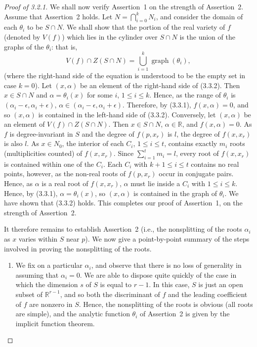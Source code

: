 \documentclass[11pt]{article}
\theoremstyle{plain}
\theoremstyle{definition}
\newcommand{\R}{\mathbb{R}}
\begin{document}
\begin{proof}[Proof of 3.2.1]
We shall now verify Assertion~1 on the strength of Assertion~2. Assume
that Assertion~2 holds. Let $N = \bigcap_{i=0}^{k} N_i$, and consider
the domain of each $\theta_i$ to be $S \cap N$. We shall show that the
portion of the real variety of $f$ (denoted by $V(f)$) which lies in
the cylinder over $S \cap N$ is the union of the graphs of the
$\theta_i$: that is,
\begin{equation}
V(f) \cap Z(S \cap N) = \bigcup_{i=1}^{k} \operatorname{graph}(\theta_i), \tag{3.3.2}
\end{equation}
(where the right-hand side of the equation is understood to be the
empty set in case $k = 0$). Let $(x, \alpha)$ be an element of the
right-hand side of (3.3.2). Then $x \in S \cap N$ and
$\alpha = \theta_i(x)$ for some $i$, $1 \le i \le k$. Hence, as the
range of $\theta_i$ is $(\alpha_i - \epsilon, \alpha_i + \epsilon)$,
$\alpha \in (\alpha_i - \epsilon, \alpha_i + \epsilon)$. Therefore, by
(3.3.1), $f(x, \alpha) = 0$, and so $(x, \alpha)$ is contained in the
left-hand side of (3.3.2). Conversely, let $(x, \alpha)$ be an element
of $V(f) \cap Z(S \cap N)$. Then $x \in S \cap N$, $\alpha \in \R$, and
$f(x, \alpha) = 0$. As $f$ is degree-invariant in $S$ and the degree
of $f(p, x_r)$ is $l$, the degree of $f(x, x_r)$ is also $l$. As
$x \in N_0$, the interior of each $C_i$, $1 \le i \le t$, contains
exactly $m_i$ roots (multiplicities counted) of $f(x, x_r)$. Since
$\sum_{i=1}^{t} m_i = l$, every root of $f(x, x_r)$ is contained within
one of the $C_i$. Each $C_i$ with $k+1 \le i \le t$ contains no real
points, however, as the non-real roots of $f(p, x_r)$ occur in
conjugate pairs. Hence, as $\alpha$ is a real root of $f(x, x_r)$,
$\alpha$ must lie inside a $C_i$ with $1 \le i \le k$. Hence, by
(3.3.1), $\alpha = \theta_i(x)$, so $(x, \alpha)$ is contained in the
graph of $\theta_i$. We have shown that (3.3.2) holds. This completes
our proof of Assertion~1, on the strength of Assertion~2.

It therefore remains to establish Assertion~2 (i.e., the nonsplitting
of the roots $\alpha_i$ as $x$ varies within $S$ near $p$). We now
give a point-by-point summary of the steps involved in proving the
nonsplitting of the roots.

\begin{enumerate}
\item We fix on a particular $\alpha_i$, and observe that there is no
loss of generality in assuming that $\alpha_i = 0$. We are able to
dispose quite quickly of the case in which the dimension $s$ of $S$ is
equal to $r-1$. In this case, $S$ is just an open subset of
$\R^{r-1}$, and so both the discriminant of $f$ and the leading
coefficient of $f$ are nonzero in $S$. Hence, the nonsplitting of the
roots is obvious (all roots are simple), and the analytic function
$\theta_i$ of Assertion~2 is given by the implicit function theorem.


\end{enumerate}
\end{proof}
\end{document}
